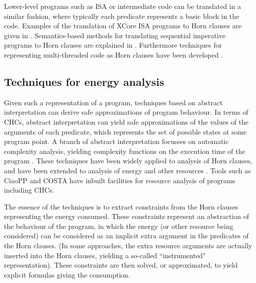Lower-level programs such as ISA or intermediate code can be translated
in a similar fashion, where typically each predicate represents a basic block 
in the code. Examples of the translation of XCore ISA programs
to Horn clauses are given in \cite{isa-energy-lopstr13-final}.
Semantics-based methods for translating sequential
imperative programs to
Horn clauses are explained in \cite{DBLP:conf/ppdp/AngelisFPP15}.
Furthermore techniques for representing multi-threaded
code as Horn clauses have been developed \cite{ GrebenshchikovLPR12}.


\subsection{Techniques for energy analysis}

Given such a representation of a program, techniques based on abstract interpretation \cite{Cousot1977}
can derive safe approximations of program behaviour.
In terms of CHCs, abstract interpretation can yield
safe approximations of the values of the arguments of each predicate, which represents the
set of possible
states at some program point.
A branch of abstract interpretation 
focusses on automatic complexity analysis, yielding complexity functions on the
execution time of the program \cite{DBLP:journals/cacm/Wegbreit75,Rosendahl89,caslog,resource-iclp07,jvm-cost-esop}.  
These techniques have been widely applied to
analysis of Horn clauses, and have been extended to analysis of energy and
other resources \cite{resource-iclp07,jvm-cost-esop}. Tools such as CiaoPP \cite{ciaopp-sas03-journal-scp} 
and COSTA \cite{AlbertAGPZ08b} have inbuilt
facilities for resource analysis of programs including CHCs.

The essence of the techniques is to extract constraints from the Horn clauses
representing the energy consumed. These constraints represent an abstraction of the behaviour
of the program, in which the energy (or other resource being considered)
can be considered as an implicit extra argument in the predicates of the Horn clauses.
(In some approaches, the extra resource arguments are actually inserted into
the Horn clauses, yielding a so-called ``instrumented" representation).
These constraints are then solved, or approximated, to yield explicit 
formulas giving the consumption.


 
